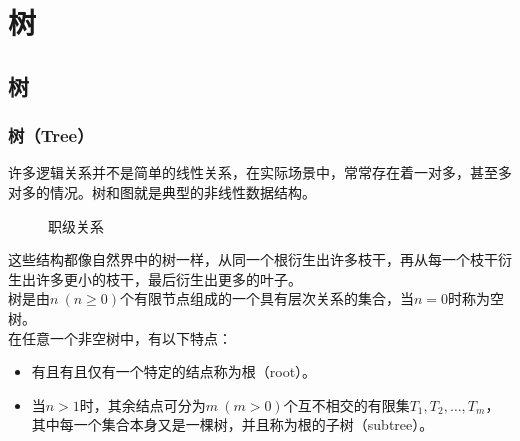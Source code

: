 \chapter{树}

\section{树}

\subsection{树（Tree）}

许多逻辑关系并不是简单的线性关系，在实际场景中，常常存在着一对多，甚至多对多的情况。树和图就是典型的非线性数据结构。 \\

\begin{figure}[H]
    \centering
    \caption{职级关系}
\end{figure}

这些结构都像自然界中的树一样，从同一个根衍生出许多枝干，再从每一个枝干衍生出许多更小的枝干，最后衍生出更多的叶子。 \\

树是由$ n\ (n \ge 0) $个有限节点组成的一个具有层次关系的集合，当$ n = 0 $时称为空树。 \\

在任意一个非空树中，有以下特点：

\begin{itemize}
    \item 有且有且仅有一个特定的结点称为根（root）。

    \item 当$ n > 1 $时，其余结点可分为$ m\ (m > 0) $个互不相交的有限集$ T_1, T_2, \dots, T_m $，其中每一个集合本身又是一棵树，并且称为根的子树（subtree）。
\end{itemize}

